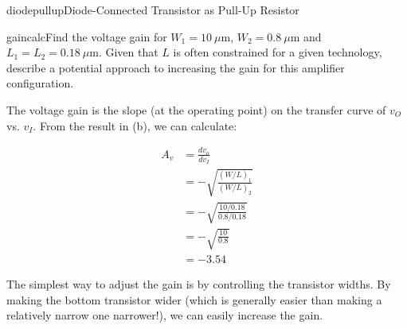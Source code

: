 \begin{mainquestion}{diodepullup}{Diode-Connected Transistor as Pull-Up Resistor}
\begin{partquestion}{gaincalc}{Find the voltage gain for $W_{1} = 10\ \mu\text{m}$, $W_{2} = 0.8\ \mu\text{m}$ and $L_{1} = L_{2} = 0.18\ \mu\text{m}$. Given that $L$ is often constrained for a given technology, describe a potential approach to increasing the gain for this amplifier configuration.}
\begin{answer}
The voltage gain is the slope (at the operating point) on the transfer curve of $v_{O}$ vs. $v_{I}$. From the result in (b), we can calculate:

\begin{align*}
    A_v &= \frac{d v_o}{d v_I} \\
    &= - \sqrt{\frac{(W / L)_1}{(W / L)_2}} \\
    &= - \sqrt{\frac{10/0.18}{0.8/0.18}} \\
    &= - \sqrt{\frac{10}{0.8}} \\
    &= - 3.54
\end{align*}

The simplest way to adjust the gain is by controlling the transistor widths. By making the bottom transistor wider (which is generally easier than making a relatively narrow one narrower!), we can easily increase the gain.
\end{answer}
\end{partquestion}

\end{mainquestion}
